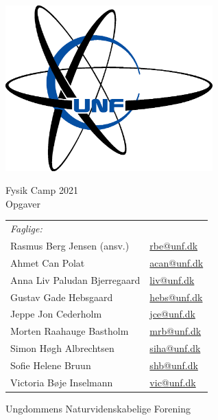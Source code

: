 \newcommand{\campyear}{2021}%
\frontmatter
{}%

\begin{center}
\includegraphics[width = 8cm]{setup/Unflogo.eps}
\vspace{1cm}

{\fontsize{24pt}{28pt}\selectfont
Fysik Camp \campyear \\[2mm]
Opgaver
}

\vspace{3cm}
\begin{tabular}{ll}
      \textit{Faglige:} & \\
      Rasmus Berg Jensen (ansv.)    	& \href{mailto:rbe@unf.dk}{rbe@unf.dk} \\
      Ahmet Can Polat	               	& \href{mailto:acan@unf.dk}{acan@unf.dk} \\
      Anna Liv Paludan Bjerregaard		& \href{mailto:livb@unf.dk}{liv@unf.dk} \\
      Gustav Gade Hebsgaard		        & \href{mailto:hebs@unf.dk}{hebs@unf.dk} \\
      Jeppe Jon Cederholm		        & \href{mailto:jce@unf.dk}{jce@unf.dk} \\
      Morten Raahauge Bastholm	    	& \href{mailto:mrb@unf.dk}{mrb@unf.dk} \\
      Simon Høgh Albrechtsen	    	& \href{mailto:siha@unf.dk}{siha@unf.dk} \\
      Sofie Helene Bruun		    	& \href{mailto:shb@unf.dk}{shb@unf.dk} \\
      Victoria Bøje Inselmann	    	& \href{mailto:vic@unf.dk}{vic@unf.dk}
    \end{tabular}

\vfill
{\fontsize{16pt}{28pt}\selectfont
Ungdommens Naturvidenskabelige Forening}
\end{center}
\newpage
\hspace{1cm}%
\vfill

